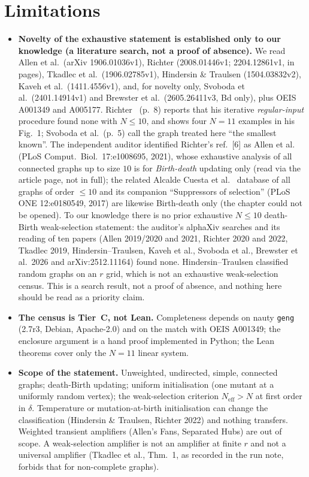 \documentclass[10pt]{article}
\newcommand{\Neff}{N_{\mathrm{eff}}}
\begin{document}
\section{Limitations}\label{sec:lim}
\begin{itemize}\itemsep=1pt
\item \textbf{Novelty of the exhaustive statement is established only to our knowledge (a literature search, not a proof of absence).} We read Allen et al.\ (arXiv 1906.01036v1), Richter (2008.01446v1; 2204.12861v1, in pages), Tkadlec et al.\ (1906.02785v1), Hindersin \& Traulsen (1504.03832v2), Kaveh et al.\ (1411.4556v1), and, for novelty only, Svoboda et al.\ (2401.14914v1) and Brewster et al.\ (2605.26411v3, Bd only), plus OEIS A001349 and A005177. Richter~\cite{rich22} (p.~8) reports that his iterative \emph{regular-input} procedure found none with $N\le10$, and shows four $N=11$ examples in his Fig.~1; Svoboda et al.\ (p.~5) call the graph treated here ``the smallest known''. The independent auditor identified Richter's ref.~[6] as Allen et al.~\cite{allen21} (PLoS Comput.\ Biol.\ 17:e1008695, 2021), whose exhaustive analysis of all connected graphs up to size $10$ is for \emph{Birth-death} updating only (read via the article page, not in full); the related Alcalde Cuesta et al.~\cite{alc17} database of all graphs of order $\le10$ and its companion ``Suppressors of selection'' (PLoS ONE 12:e0180549, 2017) are likewise Birth-death only (the chapter could not be opened). To our knowledge there is no prior exhaustive $N\le10$ death-Birth weak-selection statement: the auditor's alphaXiv searches and its reading of ten papers (Allen 2019/2020 and 2021, Richter 2020 and 2022, Tkadlec 2019, Hindersin--Traulsen, Kaveh et al., Svoboda et al., Brewster et al.\ 2026 and arXiv:2512.11164) found none. Hindersin--Traulsen classified random graphs on an $r$ grid, which is not an exhaustive weak-selection census. This is a search result, not a proof of absence, and nothing here should be read as a priority claim.
\item \textbf{The census is Tier~C, not Lean.} Completeness depends on nauty \texttt{geng} (2.7r3, Debian, Apache-2.0) and on the match with OEIS A001349; the enclosure argument is a hand proof implemented in Python; the Lean theorems cover only the $N=11$ linear system.
\item \textbf{Scope of the statement.} Unweighted, undirected, simple, connected graphs; death-Birth updating; uniform initialisation (one mutant at a uniformly random vertex); the weak-selection criterion $\Neff>N$ at first order in $\delta$. Temperature or mutation-at-birth initialisation can change the classification (Hindersin \& Traulsen, Richter 2022) and nothing transfers. Weighted transient amplifiers (Allen's Fans, Separated Hubs) are out of scope. A weak-selection amplifier is not an amplifier at finite $r$ and not a universal amplifier (Tkadlec et al., Thm.~1, as recorded in the run note, forbids that for non-complete graphs).

\end{itemize}
\end{document}
